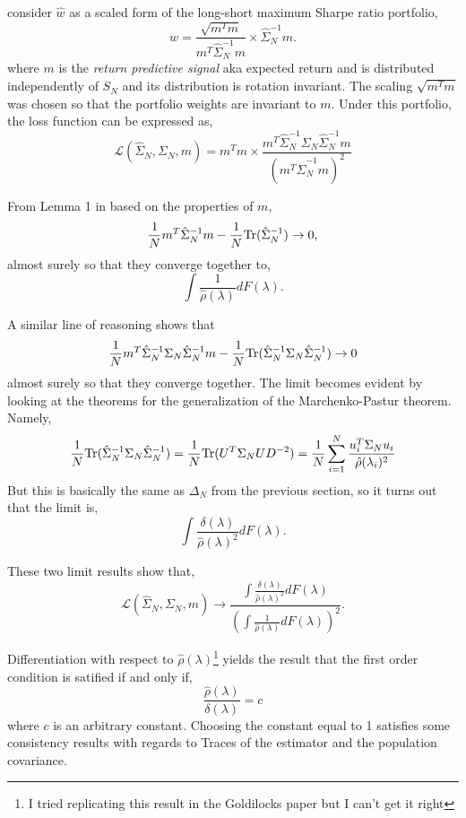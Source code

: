 \documentclass{article}
\begin{document}
\cite{Ledoit2017Nonlinear} consider $\hat{w}$ as a scaled form of the long-short
maximum Sharpe ratio portfolio,
\begin{equation}\label{eq:max_sharpe_portfolio}
	\hat{w} 
		= \frac{\sqrt{ m^Tm }}{m^T \hat{\Sigma}_N^{-1} m} \times \hat{\Sigma}_N^{-1} m.
\end{equation}
where $m$ is the \emph{return predictive signal} aka expected return and is
distributed independently of $S_N$ and its distribution is rotation invariant.
The scaling $\sqrt{ m^Tm }$ was chosen so that the portfolio weights are
invariant to $m$.  Under this portfolio, the loss function can be expressed as,
\begin{equation}\label{eq:oos_max_sharpe_loss}
	\mathcal{L}(\hat{\Sigma}_N, \Sigma_N, m)
		 = m^Tm \times \frac
		 	{m^T \hat{\Sigma}_N^{-1} \Sigma_N \hat{\Sigma}_N^{-1} m}
		 	{\left(m^T \hat{\Sigma}_N^{-1} m\right)^2}
\end{equation}

From Lemma 1 in \cite{Ledoit2011Eigenvectors} based on the properties of $m$,
$$
	\frac1N m^T \hat{\Sigma}_N^{-1} m 
		- \frac1N \mathrm{Tr}(\hat{\Sigma}_N^{-1}) \rightarrow 0,
$$
almost surely so that they converge together to,
$$
	\int \frac{1}{\hat{\rho}(\lambda)}dF(\lambda).
$$

A similar line of reasoning shows that 
$$
	\frac1N m^T \hat{\Sigma}_N^{-1} \Sigma_N \hat{\Sigma}_N^{-1} m
		- \frac1N \mathrm{Tr}(\hat{\Sigma}_N^{-1} \Sigma_N \hat{\Sigma}_N^{-1})
		\rightarrow 0
$$
almost surely so that they converge together.  The limit becomes evident by
looking at the theorems for the generalization of the Marchenko-Pastur theorem.
Namely,
$$
	\frac1N \mathrm{Tr}(\hat{\Sigma}_N^{-1} \Sigma_N \hat{\Sigma}_N^{-1})
		 = \frac1N \mathrm{Tr}(U^T \Sigma_N U D^{-2})
		 = \frac1N \sum_{i=1}^N \frac{u_i^T \Sigma_N u_i}{\hat{\rho}(\lambda_i)^2}
$$
But this is basically the same as $\Delta_N$ from the previous section, so it
turns out that the limit is,
$$
	\int \frac{\delta(\lambda)}{\hat{\rho}(\lambda)^2}dF(\lambda).
$$

These two limit results show that,
$$
	\mathcal{L}(\hat{\Sigma}_N, \Sigma_N, m)
		 \rightarrow \frac
		 		{\int \frac{\delta(\lambda)}{\hat{\rho}(\lambda)^2}dF(\lambda)}
		 		{\left( \int \frac{1}{\hat{\rho}(\lambda)}dF(\lambda) \right)^2}.
$$

Differentiation with respect to $\hat{\rho}(\lambda)$\footnote{I tried replicating this
result in the Goldilocks paper but I can't get it right} yields the result that
the first order condition is satified if and only if,
$$
	\frac{\hat{\rho}(\lambda)}{\delta(\lambda)} = c
$$
where $c$ is an arbitrary constant.  Choosing the constant equal to 1 satisfies
some consistency results with regards to Traces of the estimator and the
population covariance.
\end{document}
